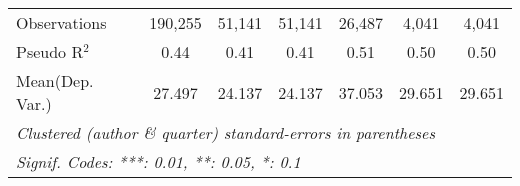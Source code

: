 \begin{tabular}{lcccccc}
   Observations                   & 190,255       & 51,141        & 51,141      & 26,487        & 4,041   & 4,041\\  
   Pseudo R$^2$                   & 0.44          & 0.41          & 0.41        & 0.51          & 0.50    & 0.50\\  
Mean(Dep. Var.) & 27.497 & 24.137 & 24.137 & 37.053 & 29.651 & 29.651 \\
   \midrule \midrule
   \multicolumn{7}{l}{\emph{Clustered (author \& quarter) standard-errors in parentheses}}\\
   \multicolumn{7}{l}{\emph{Signif. Codes: ***: 0.01, **: 0.05, *: 0.1}}\\
\end{tabular}
\par\endgroup
